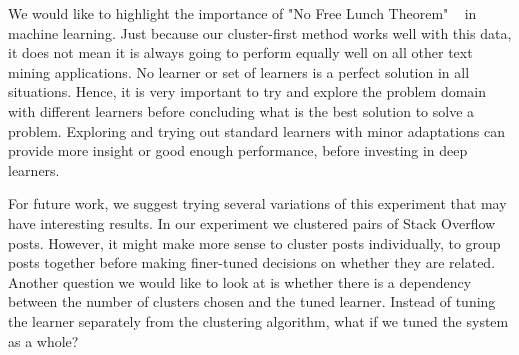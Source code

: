 \documentclass[sigconf]{acmart}
\theoremstyle{break}
\begin{document}
    We would like to highlight the importance of "No Free Lunch Theorem" ~\cite{wolpert1997no} in machine learning. Just because our cluster-first method works well with this data, it does not mean it is always going to perform equally well on all other text mining applications. No learner or set of learners is a perfect solution in all situations. Hence, it is very important to try and explore the problem domain with different learners before concluding what is the best solution to solve a problem. Exploring and trying out standard learners with minor adaptations can provide more insight or good enough performance, before investing in deep learners. 
    
    For future work, we suggest trying several variations of this experiment that may have interesting results. In our experiment we clustered pairs of Stack Overflow posts. However, it might make more sense to cluster posts individually, to group posts together before making finer-tuned decisions on whether they are related. Another question we would like to look at is whether there is a dependency between the number of clusters chosen and the tuned learner. Instead of tuning the learner separately from the clustering algorithm, what if we tuned the system as a whole? 



 
\end{document}
